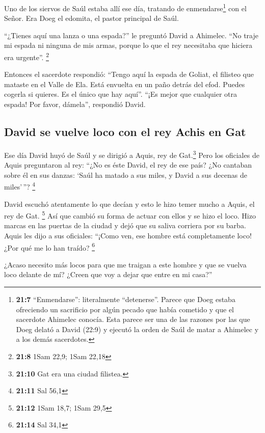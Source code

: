  Uno de los siervos de Saúl estaba allí ese día, tratando
de enmendarse\footnote{\textbf{21:7} ``Enmendarse'': literalmente
  ``detenerse''. Parece que Doeg estaba ofreciendo un sacrificio por
  algún pecado que había cometido y que el sacerdote Ahimelec conocía.
  Esta parece ser una de las razones por las que Doeg delató a David
  (22:9) y ejecutó la orden de Saúl de matar a Ahimelec y a los demás
  sacerdotes.} con el Señor. Era Doeg el edomita, el pastor principal de
Saúl.

 ``¿Tienes aquí una lanza o una espada?'' le preguntó
David a Ahimelec. ``No traje mi espada ni ninguna de mis armas, porque
lo que el rey necesitaba que hiciera era urgente''. \footnote{\textbf{21:8}
  1Sam 22,9; 1Sam 22,18}

 Entonces el sacerdote respondió: ``Tengo aquí la espada
de Goliat, el filisteo que mataste en el Valle de Ela. Está envuelta en
un paño detrás del efod. Puedes cogerla si quieres. Es el único que hay
aquí''. ``¡Es mejor que cualquier otra espada! Por favor, dámela'',
respondió David.

\hypertarget{david-se-vuelve-loco-con-el-rey-achis-en-gat}{%
\subsection{David se vuelve loco con el rey Achis en
Gat}\label{david-se-vuelve-loco-con-el-rey-achis-en-gat}}

 Ese día David huyó de Saúl y se dirigió a Aquis, rey de
Gat.\footnote{\textbf{21:10} Gat era una ciudad filistea.}
 Pero los oficiales de Aquis preguntaron al rey: ``¿No es
éste David, el rey de ese país? ¿No cantaban sobre él en sus danzas:
`Saúl ha matado a sus miles, y David a sus decenas de miles'\,''?
\footnote{\textbf{21:11} Sal 56,1}

 David escuchó atentamente lo que decían y esto le hizo
temer mucho a Aquis, el rey de Gat. \footnote{\textbf{21:12} 1Sam 18,7;
  1Sam 29,5}  Así que cambió su forma de actuar con ellos
y se hizo el loco. Hizo marcas en las puertas de la ciudad y dejó que su
saliva corriera por su barba.  Aquis les dijo a sus
oficiales: ``¡Como ven, ese hombre está completamente loco! ¿Por qué me
lo han traído? \footnote{\textbf{21:14} Sal 34,1}

 ¿Acaso necesito más locos para que me traigan a este
hombre y que se vuelva loco delante de mí? ¿Creen que voy a dejar que
entre en mi casa?''

